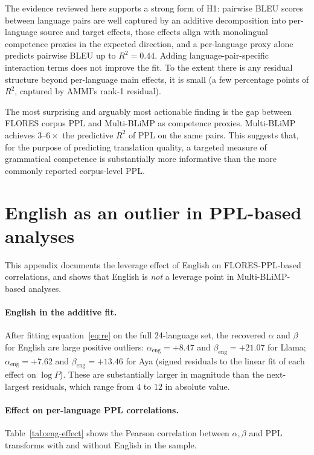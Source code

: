 \documentclass[11pt]{article}
\begin{document}
The evidence reviewed here supports a strong form of H1: pairwise BLEU
scores between language pairs are well captured by an additive
decomposition into per-language source and target effects, those
effects align with monolingual competence proxies in the expected
direction, and a per-language proxy alone predicts pairwise BLEU up
to $R^2 = 0.44$. Adding language-pair-specific interaction terms does
not improve the fit. To the extent there is any residual structure
beyond per-language main effects, it is small (a few percentage
points of $R^2$, captured by AMMI's rank-1 residual).

The most surprising and arguably most actionable finding is the gap
between FLORES corpus PPL and Multi-BLiMP as competence proxies.
Multi-BLiMP achieves $3$--$6\times$ the predictive $R^2$ of PPL on the
same pairs. This suggests that, for the purpose of predicting
translation quality, a targeted measure of grammatical competence is
substantially more informative than the more commonly reported
corpus-level PPL.

\appendix

\section{English as an outlier in PPL-based analyses}
\label{app:english}

This appendix documents the leverage effect of English on
FLORES-PPL-based correlations, and shows that English is \emph{not} a
leverage point in Multi-BLiMP-based analyses.

\paragraph{English in the additive fit.}
After fitting equation~\eqref{eq:re} on the full 24-language set, the
recovered $\alpha$ and $\beta$ for English are large positive
outliers: $\alpha_{\text{eng}} = +8.47$ and $\beta_{\text{eng}} =
+21.07$ for Llama; $\alpha_{\text{eng}} = +7.62$ and $\beta_{\text{eng}}
= +13.46$ for Aya (signed residuals to the linear fit of each effect
on $\log P$). These are substantially larger in magnitude than the
next-largest residuals, which range from $4$ to $12$ in absolute
value.

\paragraph{Effect on per-language PPL correlations.}
Table~\ref{tab:eng-effect} shows the Pearson correlation between
$\alpha, \beta$ and PPL transforms with and without English in the
sample.
\end{document}
